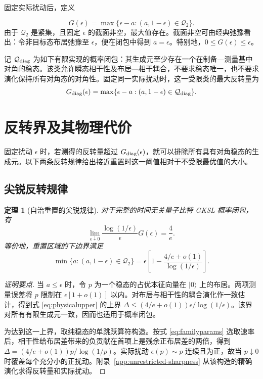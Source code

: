 \documentclass[aps,pra,reprint,amsmath,amssymb,nofootinbib,floatfix,longbibliography]{revtex4-2}
\theoremstyle{aps}
\newtheorem{theorem}{定理}
\newcommand{\Q}{\mathcal Q_2}
\newcommand{\eps}{\epsilon}
\newcommand{\ket}[1]{|#1\rangle}
\begin{document}
固定实际扰动后，定义

\begin{equation}\label{eq:G}
 G(\eps)=\max\{\eps-a:(a,1-\eps)\in\Q\}.
\end{equation}
由于 $\Q$ 是紧集，且固定 $\eps$ 的截面非空，最大值存在。截面非空可由经典弛豫看出：令非目标态布居弛豫至 $\eps$，便在闭包中得到 $a=\eps$。特别地，$0\le G(\eps)\le\eps$。

记 $\mathcal Q_{\rm diag}$ 为如下有限实现的概率闭包：其生成元至少存在一个在制备—测量基中对角的稳态。该类允许瞬态相干性及布居—相干耦合，不要求稳态唯一，也不要求演化保持所有对角态的对角性。固定同一实际扰动时，这一受限类的最大反转量为
\begin{equation}\label{eq:G-diag}
 G_{\rm diag}(\eps)=\max\{\eps-a:(a,1-\eps)\in\mathcal Q_{\rm diag}\}.
\end{equation}

\section{反转界及其物理代价}\label{sec:results}\label{sec:diagonal}

固定扰动 $\eps$ 时，若测得的反转量超过 $G_{\rm diag}(\eps)$，就可以排除所有具有对角稳态的生成元。以下两条反转规律给出接近重置时这一阈值相对于不受限最优值的大小。

\subsection{尖锐反转规律}

\begin{theorem}[自治重置的尖锐规律]\label{thm:main}
对于完整的时间无关量子比特 GKSL 概率闭包，有
\begin{equation}\label{eq:main}
 \lim_{\eps\downarrow0}\frac{\log(1/\eps)}{\eps}G(\eps)=\frac4e.
\end{equation}
等价地，重置区域的下边界满足
\begin{equation}\label{eq:boundary}
 \min\{a:(a,1-\eps)\in\Q\}
 =\eps\left[1-\frac{4/e+o(1)}{\log(1/\eps)}\right].
\end{equation}
\end{theorem}
\begin{proof}[证明要点]
当 $a\le\eps$ 时，令 $p$ 为一个稳态的占优本征向量在 $\ket0$ 上的布居。两项测量误差将 $p$ 限制在 $\eps[1+o(1)]$ 以内。对布居与相干性的耦合演化作一致估计，得到式 \eqref{eq:physicalupper} 的上界 $\Delta\le(4/e+o(1))\eps/\log(1/\eps)$。该界对所有有限生成元一致，因而也适用于概率闭包。

为达到这一上界，取纯稳态的单跳跃算符构造。按式 \eqref{eq:familyparams} 选取速率后，相干性给布居差带来的负贡献在首项上是残余正布居差的两倍，得到 $\Delta=(4/e+o(1))p/\log(1/p)$。实际扰动 $\eps(p)\sim p$ 连续且为正，故当 $p\downarrow0$ 时覆盖每个充分小的正扰动。附录~\ref{app:unrestricted-sharpness} 从该构造的精确演化求得反转量和实际扰动。
\end{proof}
\end{document}
